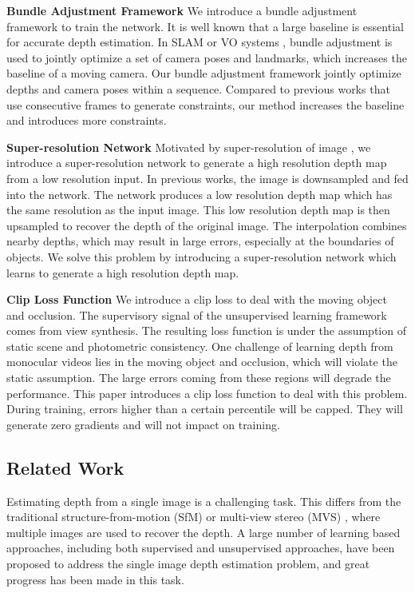 \documentclass[10pt,twocolumn,letterpaper]{article}
\begin{document}
\textbf{Bundle Adjustment Framework} \quad We introduce a bundle adjustment framework to train the network. It is well known that a large baseline is essential for accurate depth estimation. In SLAM or VO systems \cite{mur2017orb,engel2014lsd,engel2018direct}, bundle adjustment is used to jointly optimize a set of camera poses and landmarks, which increases the baseline of a moving camera. Our bundle adjustment framework jointly optimize depths  and camera poses within a sequence. Compared to previous works \cite{zhou2017unsupervised,yin2018geonet,zou2018df,wang2018learning,mahjourian2018unsupervised} that use consecutive frames to generate constraints, our method increases the baseline and introduces more constraints. 

\textbf{Super-resolution Network} \quad Motivated by super-resolution of image \cite{lai2018fast,wang2018recovering}, we introduce a super-resolution network to generate a high resolution depth map from a low resolution input. In previous works, the image is downsampled and fed into the network. The network produces a low resolution depth map which has the same resolution as the input image. This low resolution depth map is then upsampled to recover the depth of the original image. The interpolation combines nearby depths, which may result in large errors, especially at the boundaries of objects. We solve this problem by introducing  a super-resolution network which learns to generate a high resolution depth map. 

\textbf{Clip Loss Function} \quad We introduce a clip loss to deal with the  moving object and occlusion. The supervisory signal of the unsupervised learning framework comes from view synthesis. The resulting loss function is under the assumption of static scene and photometric consistency.  One challenge of learning depth from monocular videos lies in the moving object and occlusion, which will violate the static assumption. The large errors coming from these regions will degrade the performance. This paper introduces a clip loss function to deal with this problem. During training, errors higher than a certain percentile will be capped. They will generate zero gradients and will not impact on training. %



\subsection{Related Work}
Estimating depth from a single image is a challenging task. This differs from the traditional structure-from-motion (SfM) \cite{schonberger2016structure} or multi-view stereo (MVS)  \cite{schonberger2016pixelwise}, where  multiple images are used to recover the depth. A large number of learning based approaches, including both supervised and unsupervised approaches, have been proposed to address the single image depth estimation problem, and great progress has been made in this task.
\end{document}
